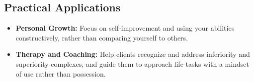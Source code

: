 \subsection*{Practical Applications}
\begin{itemize}
    \item \textbf{Personal Growth:} Focus on self-improvement and using your abilities constructively, rather than comparing yourself to others.
    \item \textbf{Therapy and Coaching:} Help clients recognize and address inferiority and superiority complexes, and guide them to approach life tasks with a mindset of use rather than possession.
\end{itemize}